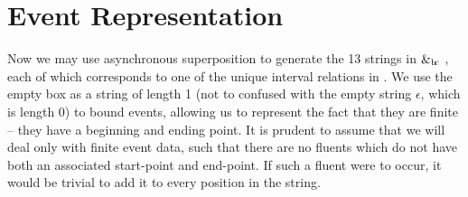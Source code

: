 \documentclass[a4paper,11pt]{article}
\newcommand{\bc}{{\rm b\!c}}
\newcommand{\vph}[1]{\vphantom{#1}}
\begin{document}
\section{Event Representation}\label{secER}
Now we may use asynchronous superposition to generate the 13 strings in 
\fbox{\vph{$e'$}}\fbox{$e\vph{e'}$}\fbox{\vph{$e'$}} 
$\&_{\bc}$ 
\fbox{\vph{$e'$}}\fbox{\vph{$e'$}}, each of which corresponds to one 
of the unique interval relations in \cite{allen1983maintaining}.
We use the empty box \fbox{$\vph{'}$} as a string of length 1 (not to confused 
with the empty string $\epsilon$, which is length 0) to bound events, allowing 
us to represent the fact that they are finite -- they have a beginning and 
ending point. It is prudent to assume that we will deal only with finite event 
data, such that there are no fluents which do not have both an associated 
start-point and end-point. If such a fluent were to occur, it would be trivial 
to add it to every position in the string. 
\end{document}
